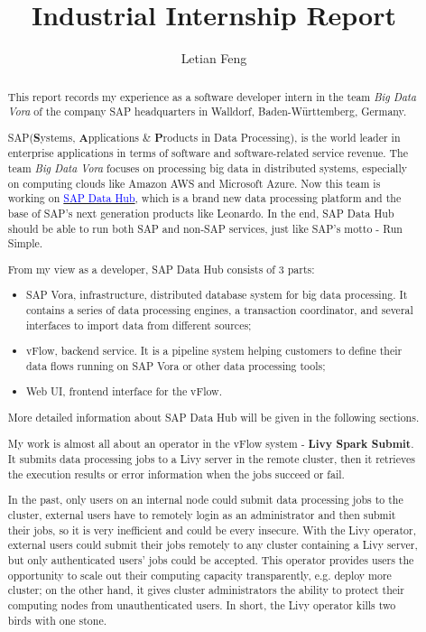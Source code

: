 \documentclass[article,colorback,accentcolor=tud4c]{tudreport}
\title{Industrial Internship Report}
\subtitle{Letian Feng}
\begin{document}
\maketitle
\begin{abstract}

This report records my experience as a software developer intern in the team \textit{Big Data Vora} of the company SAP headquarters in Walldorf, Baden-W{\"u}rttemberg, Germany.

SAP(\textbf{S}ystems, \textbf{A}pplications \& \textbf{P}roducts in Data Processing), is the world leader in enterprise applications in terms of software and software-related service revenue. 
The team \textit{Big Data Vora} focuses on processing big data in distributed systems, especially on computing clouds like Amazon AWS and Microsoft Azure. 
Now this team is working on \href{https://www.sap.com/products/data-hub.html}{\textcolor{blue}{SAP Data Hub}}, which is a brand new data processing platform and the base of SAP's next generation products like Leonardo. 
In the end, SAP Data Hub should be able to run both SAP and non-SAP services, just like SAP's motto - Run Simple.

From my view as a developer, SAP Data Hub consists of 3 parts: 
\begin{itemize}\itemsep-\the\parsep
	\item SAP Vora, infrastructure, distributed database system for big data processing. It contains a series of data processing engines, a transaction coordinator, and several interfaces to import data from different sources;
 	\item vFlow, backend service. It is a pipeline system helping customers to define their data flows running on SAP Vora or other data processing tools;
 	\item Web UI, frontend interface for the vFlow.
\end{itemize}

More detailed information about SAP Data Hub will be given in the following sections.

My work is almost all about an operator in the vFlow system - \textbf{Livy Spark Submit}. It submits data processing jobs to a Livy server in the remote cluster, then it retrieves the execution results or error information when the jobs succeed or fail.

In the past, only users on an internal node could submit data processing jobs to the cluster, external users have to remotely login as an administrator and then submit their jobs, so it is very inefficient and could be every insecure. With the Livy operator, external users could submit their jobs remotely to any cluster containing a Livy server, but only authenticated users' jobs could be accepted. This operator provides users the opportunity to scale out their computing capacity transparently, e.g. deploy more cluster; on the other hand, it gives cluster administrators the ability to protect their computing nodes from unauthenticated users. In short, the Livy operator kills two birds with one stone.


\end{abstract}
\end{document}
